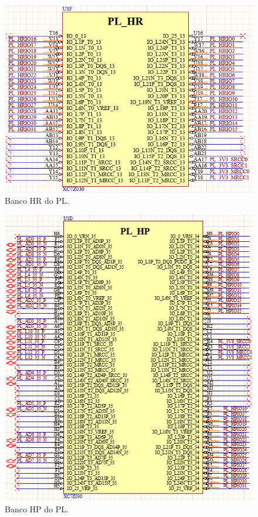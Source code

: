 \begin{figure}[H]
    \centering
    \includegraphics[scale=0.8]{images/plhr.png}
    \caption{Banco HR do PL.}
    \label{fig:plhr}
\end{figure}

\begin{figure}[H]
    \centering
    \includegraphics[scale=0.7]{images/plhp.png}
    \caption{Banco HP do PL.}
    \label{fig:plhp}
\end{figure}

